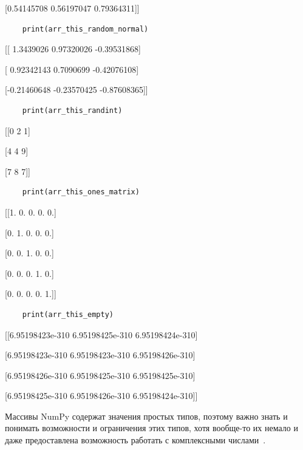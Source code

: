 \documentclass[pract]{SCWorks}
\begin{document}
\begin{itemize}
    [0.80552811 0.14153011 0.70063978]
    
    [0.54145708 0.56197047 0.79364311]]

    \begin{verbatim}
    print(arr_this_random_normal)
    \end{verbatim}

    [[ 1.3439026   0.97320026 -0.39531868]
    
    [ 0.92342143  0.7090699  -0.42076108]
    
    [-0.21460648 -0.23570425 -0.87608365]]

    \begin{verbatim}
    print(arr_this_randint)
    \end{verbatim}
    
    [[0 2 1]
    
    [4 4 9]
    
    [7 8 7]]

    \begin{verbatim}
    print(arr_this_ones_matrix)
    \end{verbatim}

    [[1. 0. 0. 0. 0.]
    
    [0. 1. 0. 0. 0.]
    
    [0. 0. 1. 0. 0.]
    
    [0. 0. 0. 1. 0.]
    
    [0. 0. 0. 0. 1.]]

    \begin{verbatim}
    print(arr_this_empty)
    \end{verbatim}

    [[6.95198423e-310 6.95198425e-310 6.95198424e-310]
    
    [6.95198423e-310 6.95198423e-310 6.95198426e-310]
    
    [6.95198426e-310 6.95198425e-310 6.95198425e-310]
    
    [6.95198425e-310 6.95198426e-310 6.95198424e-310]]

\end{itemize}

Массивы NumPy содержат значения простых типов, поэтому важно знать и понимать возможности и 
ограничения этих типов, хотя вообще-то их немало и даже предоставлена возможность работать с
комплексными числами~\cite{vanderplas,numpy-docs}.
\end{document}
